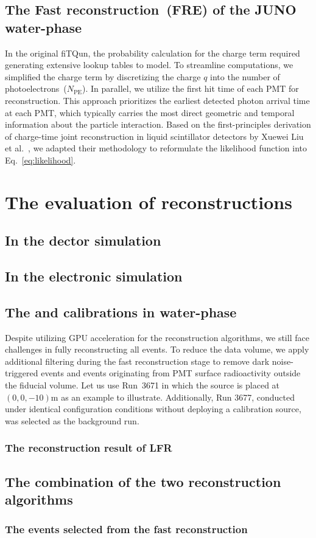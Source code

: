 \subsection{The Fast reconstruction~(FRE) of the JUNO water-phase}
In the original fiTQun, the probability calculation for the charge term required generating extensive lookup tables to model. To streamline computations, we simplified the charge term by discretizing the charge $q$ into the number of photoelectrons~($N_{\mathrm{PE}}$).
In parallel, we utilize the first hit time of each PMT for reconstruction. This approach prioritizes the earliest detected photon arrival time at each PMT, which typically carries the most direct geometric and temporal information about the particle interaction. Based on the first-principles derivation of charge-time joint reconstruction in liquid scintillator detectors by Xuewei Liu et al.~\cite{xuewei}, we adapted their methodology to reformulate the likelihood function into Eq.~\ref{eq:likelihood}.
\section{The evaluation of reconstructions}
\subsection{In the dector simulation}
\subsection{In the electronic simulation}
\subsection{The  and  calibrations in water-phase}
Despite utilizing GPU acceleration for the reconstruction algorithms, we still face challenges in fully reconstructing all events. To reduce the data volume, we apply additional filtering during the fast reconstruction stage to remove dark noise-triggered events and events originating from PMT surface radioactivity outside the fiducial volume.
Let us use Run~3671 in which the  source is placed at $(0,0,-10)$\si{m} as an example to illustrate. Additionally, Run 3677, conducted under identical configuration conditions without deploying a calibration source, was selected as the background run.
\subsubsection{The reconstruction result of LFR}


\subsection{The combination of the two reconstruction algorithms}
\subsubsection{The events selected from the fast reconstruction}
